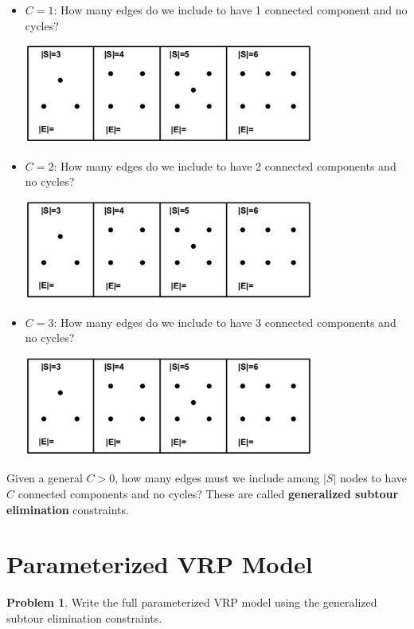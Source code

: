 \documentclass[11pt]{article}
\theoremstyle{definition}
\newtheorem{problem}{Problem}
\begin{document}
\begin{itemize}
\item $C = 1$: How many edges do we include to have 1 connected component and no cycles?
\begin{center}
\includegraphics[width=0.75\textwidth]{four_graphs.png}
\end{center}
\item $C = 2$: How many edges do we include to have 2 connected components and no cycles?
\begin{center}
\includegraphics[width=0.75\textwidth]{four_graphs.png}
\end{center}
\item $C = 3$: How many edges do we include to have 3 connected components and no cycles?
\begin{center}
\includegraphics[width=0.75\textwidth]{four_graphs.png}
\end{center}
\end{itemize}

\newpage

Given a general $C > 0$, how many edges must we include among $|S|$ nodes to have $C$ connected components and no cycles? These are called \textbf{generalized subtour elimination} constraints.
\vspace{1in}

\section{Parameterized VRP Model}

\begin{problem}
Write the full parameterized VRP model using the generalized subtour elimination constraints.
\end{problem}
\end{document}
